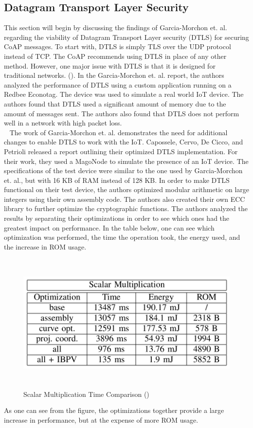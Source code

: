 \documentclass[letterpaper, 12pt]{article}
\begin{document}
\begin{flushleft}
\subsection*{Datagram Transport Layer Security}
This section will begin by discussing the findings of Garcia-Morchon et. al. regarding the viability of Datagram Transport Layer security (DTLS)
for securing CoAP messages. To start with, DTLS is simply TLS over the UDP protocol instead of TCP. The CoAP recommends using DTLS in place of any
other method. However, one major issue with DTLS is that it is designed for traditional networks. (\cite{Capossele}). In the Garcia-Morchon et. al. report, the authors analyzed the performance of DTLS using a custom application running on a Redbee Econotag. The device
was used to simulate a real world IoT device. The authors found that DTLS used a significant amount of memory due to the amount of messages sent. 
The authors also found that DTLS does not perform well in a network with high packet loss. \\
~\newline
The work of Garcia-Morchon et. al. demonstrates the need for additional changes to enable DTLS to work with the IoT. Capossele, Cervo, De Cicco,
and Petrioli released a report outlining their optimized DTLS implementation. For their work, they used a MagoNode to simulate the presence of an
IoT device. The specifications of the test device were similar to the one used by Garcia-Morchon et. al., but with 16 KB of RAM instead of 128 KB.
In order to make DTLS functional on their test device, the authors optimized modular arithmetic on large integers using their own assembly code.
The authors also created their own ECC library to further optimize the cryptographic functions. The authors analyzed the results by separating their
optimizations in order to see which ones had the greatest impact on performance. In the table below, one can see which optimization was performed,
the time the operation took, the energy used, and the increase in ROM usage. 

\begin{figure}[H]
	\includegraphics[width=\linewidth,height=7cm,keepaspectratio]{figure6.png}
	\caption{Scalar Multiplication Time Comparison (\cite{Capossele})}
	\label{fig:arch}
\end{figure}

As one can see from the figure, the optimizations together provide a large increase in performance, but at the expense of more ROM usage. 

\newpage
{}
\printbibliography
\end{flushleft}
\end{document}
